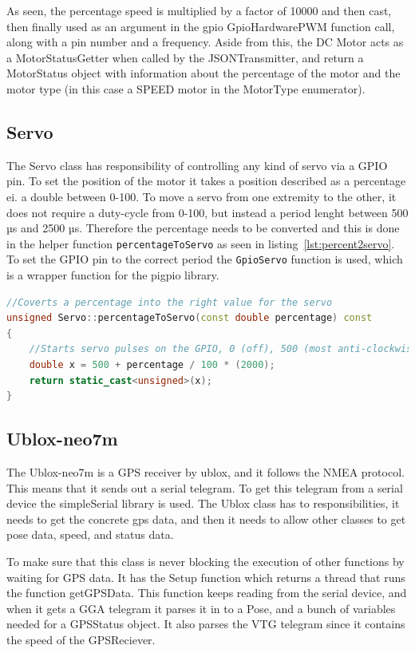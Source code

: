 As seen, the percentage speed is multiplied by a factor of 10000 and then cast, then finally used as an argument in the gpio GpioHardwarePWM function call, along with a pin number and a frequency. Aside from this, the DC Motor acts as a MotorStatusGetter when called by the JSONTransmitter, and return a MotorStatus object with information about the percentage of the motor and the motor type (in this case a SPEED motor in the MotorType enumerator).

\subsection{Servo}
The Servo class has responsibility of controlling any kind of servo via a GPIO pin. To set the position of the motor it takes a position described as a percentage ei. a double between 0-100. To move a servo from one extremity to the other, it does not require a duty-cycle from 0-100, but instead a period lenght between 500 µs and 2500 µs\cite{pigpio}. Therefore the percentage needs to be converted and this is done in the helper function \texttt{percentageToServo} as seen in listing~\ref{lst:percent2servo}. To set the GPIO pin to the correct period the \texttt{GpioServo} function is used, which is a wrapper function for the pigpio library\cite{pigpio}.

\begin{lstlisting}[caption = {Percentage to servo periode convertion function}, captionpos=b, label={lst:percent2servo}, language=C++,firstnumber=1]
//Coverts a percentage into the right value for the servo
unsigned Servo::percentageToServo(const double percentage) const
{
	//Starts servo pulses on the GPIO, 0 (off), 500 (most anti-clockwise) to 2500 (most clockwise). 
	double x = 500 + percentage / 100 * (2000); 
	return static_cast<unsigned>(x);
}
\end{lstlisting}

\subsection{Ublox-neo7m}
The Ublox-neo7m is a GPS receiver by ublox, and it follows the NMEA protocol. This means that it sends out a serial telegram. To get this telegram from a serial device the simpleSerial library is used\cite{simple_serial}. The Ublox class has to responsibilities, it needs to get the concrete gps data, and then it needs to allow other classes to get pose data, speed, and status data. 

To make sure that this class is never blocking the execution of other functions by waiting for GPS data. It has the Setup function which returns a thread that runs the function getGPSData. This function keeps reading from the serial device, and when it gets a GGA telegram it parses it in to a Pose, and a bunch of variables needed for a GPSStatus object. It also parses the VTG telegram since it contains the speed of the GPSReciever. 


